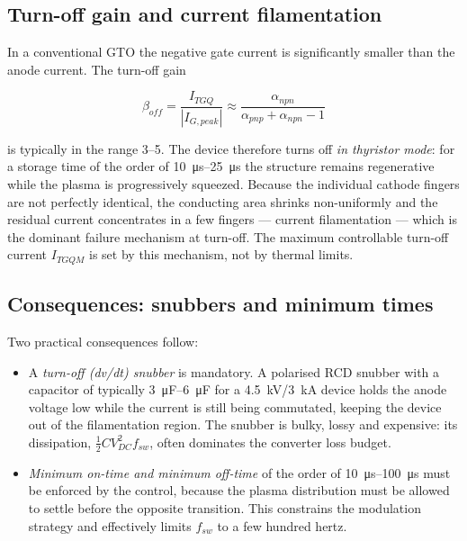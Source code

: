 \documentclass[11pt,a4paper]{report}
\begin{document}
\subsection{Turn-off gain and current filamentation}

In a conventional GTO the negative gate current is significantly smaller than
the anode current. The turn-off gain

\begin{equation}
\beta_{off} = \frac{I_{TGQ}}{|I_{G,peak}|} \approx \frac{\alpha_{npn}}{\alpha_{pnp} + \alpha_{npn} - 1}
\end{equation}

is typically in the range \numrange{3}{5}. The device therefore turns off
\emph{in thyristor mode}: for a storage time of the order of
\SIrange{10}{25}{\micro\second} the structure remains regenerative while the
plasma is progressively squeezed. Because the individual cathode fingers are not
perfectly identical, the conducting area shrinks non-uniformly and the residual
current concentrates in a few fingers --- current filamentation --- which is the
dominant failure mechanism at turn-off. The maximum controllable turn-off
current $I_{TGQM}$ is set by this mechanism, not by thermal limits.

\subsection{Consequences: snubbers and minimum times}

Two practical consequences follow:

\begin{itemize}[nosep]
  \item A \emph{turn-off (dv/dt) snubber} is mandatory. A polarised RCD snubber
        with a capacitor of typically \SIrange{3}{6}{\micro\farad} for a
        \SI{4.5}{\kilo\volt}/\SI{3}{\kilo\ampere} device holds the anode voltage
        low while the current is still being commutated, keeping the device out
        of the filamentation region. The snubber is bulky, lossy and expensive:
        its dissipation, $\tfrac{1}{2}C V_{DC}^{2} f_{sw}$, often dominates the
        converter loss budget.
  \item \emph{Minimum on-time and minimum off-time} of the order of
        \SIrange{10}{100}{\micro\second} must be enforced by the control, because
        the plasma distribution must be allowed to settle before the opposite
        transition. This constrains the modulation strategy and effectively
        limits $f_{sw}$ to a few hundred hertz.
\end{itemize}
\end{document}
